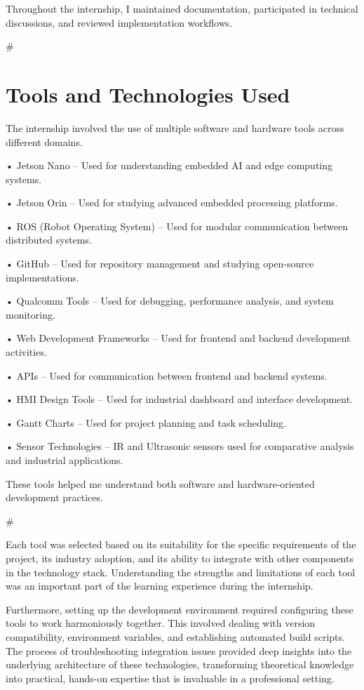 \documentclass[12pt,a4paper]{report}
\begin{document}
Throughout the internship, I maintained documentation, participated in technical discussions, and reviewed implementation workflows.


\#


\section{Tools and Technologies Used}

The internship involved the use of multiple software and hardware tools across different domains.


• Jetson Nano – Used for understanding embedded AI and edge computing systems.


• Jetson Orin – Used for studying advanced embedded processing platforms.


• ROS (Robot Operating System) – Used for modular communication between distributed systems.


• GitHub – Used for repository management and studying open-source implementations.


• Qualcomm Tools – Used for debugging, performance analysis, and system monitoring.


• Web Development Frameworks – Used for frontend and backend development activities.


• APIs – Used for communication between frontend and backend systems.


• HMI Design Tools – Used for industrial dashboard and interface development.


• Gantt Charts – Used for project planning and task scheduling.


• Sensor Technologies – IR and Ultrasonic sensors used for comparative analysis and industrial applications.


These tools helped me understand both software and hardware-oriented development practices.


\#


Each tool was selected based on its suitability for the specific requirements of the project, its industry adoption, and its ability to integrate with other components in the technology stack. Understanding the strengths and limitations of each tool was an important part of the learning experience during the internship.


Furthermore, setting up the development environment required configuring these tools to work harmoniously together. This involved dealing with version compatibility, environment variables, and establishing automated build scripts. The process of troubleshooting integration issues provided deep insights into the underlying architecture of these technologies, transforming theoretical knowledge into practical, hands-on expertise that is invaluable in a professional setting.
\end{document}
